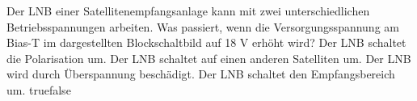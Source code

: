     {Der LNB einer Satellitenempfangsanlage kann mit zwei unterschiedlichen Betriebsspannungen arbeiten. Was passiert, wenn die Versorgungsspannung am Bias-T im dargestellten Blockschaltbild auf 18 V erhöht wird?}
    {Der LNB schaltet die Polarisation um. }
    {Der LNB schaltet auf einen anderen Satelliten um. }
    {Der LNB wird durch Überspannung beschädigt. }
    {Der LNB schaltet den Empfangsbereich um. }
    {true}{false}